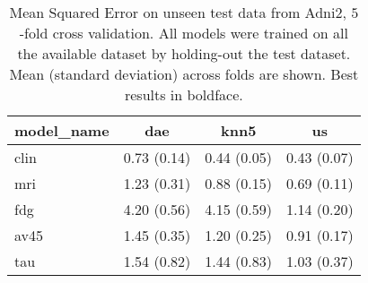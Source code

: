 \begin{table}[!t]
\caption{
Mean Squared Error on unseen test data from Adni2, $5$-fold cross validation.
All models were trained on all the available dataset by holding-out the test dataset.
Mean (standard deviation) across folds are shown. Best results in boldface.
}
\centering
\label{table:model_comparison}
\begin{tabular}{lccc}
\toprule
model\_name &          dae &         knn5 &           us \\
\midrule
clin       &  0.73 (0.14) &  0.44 (0.05) &  0.43 (0.07) \\
mri        &  1.23 (0.31) &  0.88 (0.15) &  0.69 (0.11) \\
fdg        &  4.20 (0.56) &  4.15 (0.59) &  1.14 (0.20) \\
av45       &  1.45 (0.35) &  1.20 (0.25) &  0.91 (0.17) \\
tau        &  1.54 (0.82) &  1.44 (0.83) &  1.03 (0.37) \\
\bottomrule
\end{tabular}
\end{table}

